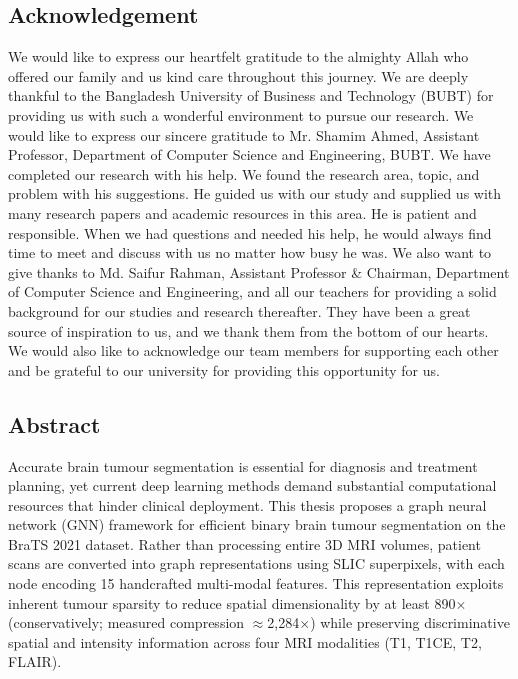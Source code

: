 \documentclass{article}
\begin{document}
\begin{center}
    \section*{Acknowledgement}
\end{center}
\large We would like to express our heartfelt gratitude to the almighty Allah who offered our family and us kind care throughout this journey. We are deeply thankful to the Bangladesh University of Business and Technology (BUBT) for providing us with such a wonderful environment to pursue our research. We would like to express our sincere gratitude to Mr. Shamim Ahmed, Assistant Professor, Department of Computer Science and Engineering, BUBT. We have completed our research with his help. We found the research area, topic, and problem with his suggestions. He guided us with our study and supplied us with many research papers and academic resources in this area. He is patient and responsible. When we had questions and needed his help, he would always find time to meet and discuss with us no matter how busy he was. We also want to give thanks to Md. Saifur Rahman, Assistant Professor \& Chairman, Department of Computer Science and Engineering, and all our teachers for providing a solid background for our studies and research thereafter. They have been a great source of inspiration to us, and we thank them from the bottom of our hearts. We would also like to acknowledge our team members for supporting each other and be grateful to our university for providing this opportunity for us.
\cleardoublepage

\begin{center}
    \section*{Abstract}
\end{center}

Accurate brain tumour segmentation is essential for diagnosis and treatment planning, yet current deep learning methods demand substantial computational resources that hinder clinical deployment. This thesis proposes a graph neural network (GNN) framework for efficient binary brain tumour segmentation on the BraTS 2021 dataset. Rather than processing entire 3D MRI volumes, patient scans are converted into graph representations using SLIC superpixels, with each node encoding 15 handcrafted multi-modal features. This representation exploits inherent tumour sparsity to reduce spatial dimensionality by at least 890$\times$ (conservatively; measured compression $\approx$2,284$\times$) while preserving discriminative spatial and intensity information across four MRI modalities (T1, T1CE, T2, FLAIR).
\end{document}
